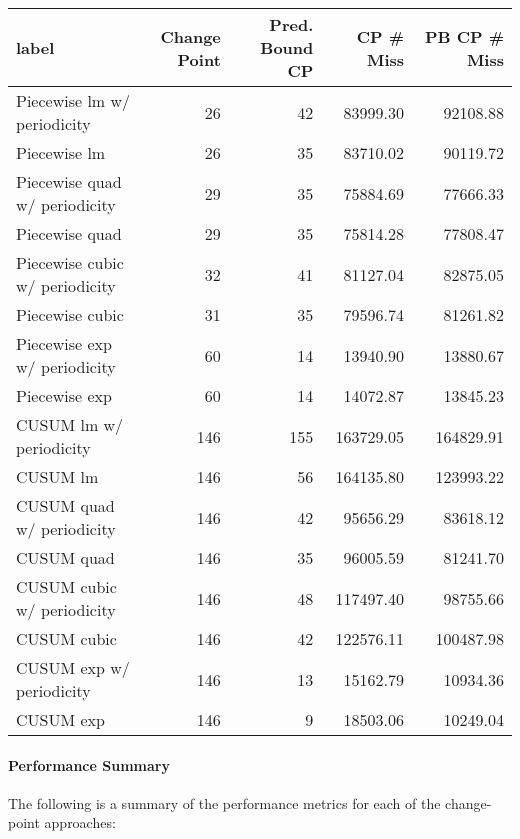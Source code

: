 \documentclass[
]{article}
\begin{document}
\begin{table}
\centering
\begin{tabular}{l|r|r|r|r}
\hline
label & Change Point & Pred. Bound CP & CP \# Miss  & PB CP \# Miss\\
\hline
Piecewise lm w/ periodicity & 26 & 42 & 83999.30 & 92108.88\\
\hline
Piecewise lm & 26 & 35 & 83710.02 & 90119.72\\
\hline
Piecewise quad w/ periodicity & 29 & 35 & 75884.69 & 77666.33\\
\hline
Piecewise quad & 29 & 35 & 75814.28 & 77808.47\\
\hline
Piecewise cubic w/ periodicity & 32 & 41 & 81127.04 & 82875.05\\
\hline
Piecewise cubic & 31 & 35 & 79596.74 & 81261.82\\
\hline
Piecewise exp w/ periodicity & 60 & 14 & 13940.90 & 13880.67\\
\hline
Piecewise exp & 60 & 14 & 14072.87 & 13845.23\\
\hline
CUSUM lm w/ periodicity & 146 & 155 & 163729.05 & 164829.91\\
\hline
CUSUM lm & 146 & 56 & 164135.80 & 123993.22\\
\hline
CUSUM quad w/ periodicity & 146 & 42 & 95656.29 & 83618.12\\
\hline
CUSUM quad & 146 & 35 & 96005.59 & 81241.70\\
\hline
CUSUM cubic w/ periodicity & 146 & 48 & 117497.40 & 98755.66\\
\hline
CUSUM cubic & 146 & 42 & 122576.11 & 100487.98\\
\hline
CUSUM exp w/ periodicity & 146 & 13 & 15162.79 & 10934.36\\
\hline
CUSUM exp & 146 & 9 & 18503.06 & 10249.04\\
\hline
\end{tabular}
\end{table}

\hypertarget{performance-summary-1}{%
\paragraph{Performance Summary}\label{performance-summary-1}}

The following is a summary of the performance metrics for each of the
change-point approaches:
\end{document}
